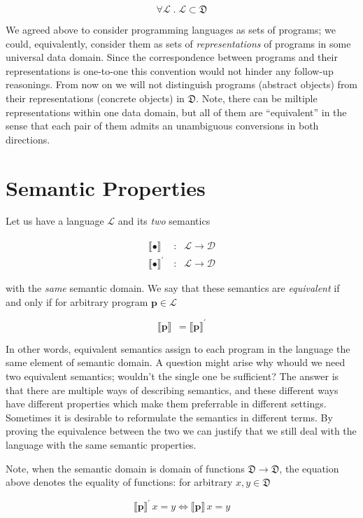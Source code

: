 \documentclass{book}
\newcommand{\sembr}[1]{\llbracket{#1}\rrbracket}
\newcommand{\primi}[1]{\mathbf{#1}}
\newcommand{\ph}{{\phantom{x}}}
\begin{document}
\[
\forall \mathcal{L}\; .\; \mathcal{L}\subset\mathfrak{D}
\]

We agreed above to consider programming languages as sets of programs; we could, equivalently, consider them as sets of \emph{representations} of
programs in some universal data domain. Since the correspondence between programs and their representations is one-to-one this convention would
not hinder any follow-up reasonings. From now on we will not distinguish programs (abstract objects) from their representations (concrete objects)
in $\mathfrak{D}$. Note, there can be miltiple representations within one data domain, but all of them are ``equivalent'' in the sense that
each pair of them admits an unambiguous conversions in both directions.

\section{Semantic Properties}

Let us have a language $\mathcal{L}$ and its \emph{two} semantics

\[
\begin{array}{rcl}
    \sembr{\bullet}^\ph & : & \mathcal{L} \to \mathcal{D}\\
  \sembr{\bullet}^\prime & : & \mathcal{L} \to \mathcal{D}
\end{array}
\]

with the \emph{same} semantic domain. We say that these semantics are \emph{equivalent} if and only if for arbitrary program $\primi{p}\in\mathcal{L}$

\[
\sembr{\primi{p}}^\ph=\sembr{\primi{p}}^\prime
\]

In other words, equivalent semantics assign to each program in the language the same element of semantic domain. A question might arise why whould we
need two equivalent semantics; wouldn't the single one be sufficient? The answer is that there are multiple ways of
describing semantics, and these different ways have different properties which make them preferrable in different settings. Sometimes it is desirable to
reformulate the semantics in different terms. By proving the equivalence between the two we can justify that we still deal with the language with the same
semantic properties.

Note, when the semantic domain is domain of functions $\mathfrak{D}\to\mathfrak{D}$, the equation above denotes the equality of functions: for
arbitrary $x, y\in\mathfrak{D}$

\[
\sembr{\primi{p}}^\prime\,x=y \Leftrightarrow \sembr{\primi{p}}\,x=y
\]
\end{document}
